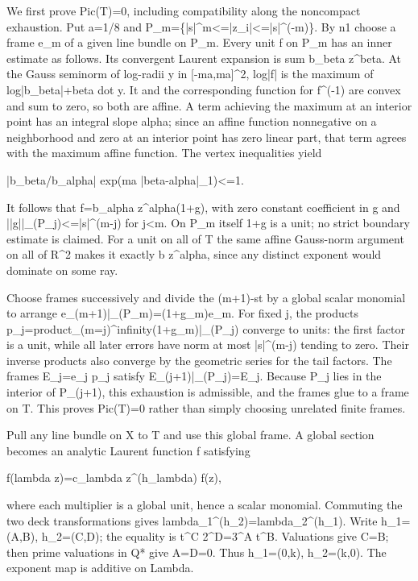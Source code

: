 \documentclass[11pt]{article}
\begin{document}
We first prove Pic(T)=0, including compatibility along the noncompact exhaustion. Put a=1/8 and P\_m=\{|s|\textasciicircum{}m<=|z\_i|<=|s|\textasciicircum{}(-m)\}. By n1 choose a frame e\_m of a given line bundle on P\_m. Every unit f on P\_m has an inner estimate as follows. Its convergent Laurent expansion is sum b\_beta z\textasciicircum{}beta. At the Gauss seminorm of log-radii y in [-ma,ma]\textasciicircum{}2, log|f| is the maximum of log|b\_beta|+beta dot y. It and the corresponding function for f\textasciicircum{}(-1) are convex and sum to zero, so both are affine. A term achieving the maximum at an interior point has an integral slope alpha; since an affine function nonnegative on a neighborhood and zero at an interior point has zero linear part, that term agrees with the maximum affine function. The vertex inequalities yield

|b\_beta/b\_alpha| exp(ma |beta-alpha|\_1)<=1.

It follows that f=b\_alpha z\textasciicircum{}alpha(1+g), with zero constant coefficient in g and ||g||\_(P\_j)<=|s|\textasciicircum{}(m-j) for j<m. On P\_m itself 1+g is a unit; no strict boundary estimate is claimed. For a unit on all of T the same affine Gauss-norm argument on all of R\textasciicircum{}2 makes it exactly b z\textasciicircum{}alpha, since any distinct exponent would dominate on some ray.

Choose frames successively and divide the (m+1)-st by a global scalar monomial to arrange e\_(m+1)|\_(P\_m)=(1+g\_m)e\_m. For fixed j, the products p\_j=product\_(m=j)\textasciicircum{}infinity(1+g\_m)|\_(P\_j) converge to units: the first factor is a unit, while all later errors have norm at most |s|\textasciicircum{}(m-j) tending to zero. Their inverse products also converge by the geometric series for the tail factors. The frames E\_j=e\_j p\_j satisfy E\_(j+1)|\_(P\_j)=E\_j. Because P\_j lies in the interior of P\_(j+1), this exhaustion is admissible, and the frames glue to a frame on T. This proves Pic(T)=0 rather than simply choosing unrelated finite frames.

Pull any line bundle on X to T and use this global frame. A global section becomes an analytic Laurent function f satisfying

f(lambda z)=c\_lambda z\textasciicircum{}(h\_lambda) f(z),

where each multiplier is a global unit, hence a scalar monomial. Commuting the two deck transformations gives lambda\_1\textasciicircum{}(h\_2)=lambda\_2\textasciicircum{}(h\_1). Write h\_1=(A,B), h\_2=(C,D); the equality is t\textasciicircum{}C 2\textasciicircum{}D=3\textasciicircum{}A t\textasciicircum{}B. Valuations give C=B; then prime valuations in Q* give A=D=0. Thus h\_1=(0,k), h\_2=(k,0). The exponent map is additive on Lambda.
\end{document}
